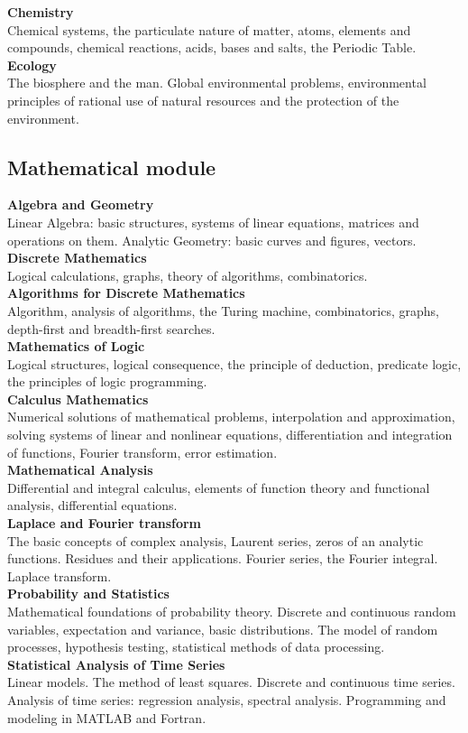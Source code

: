 \documentclass[a4paper, 12pt]{article}
\newcommand{\group}[1] {\subsection{#1}}
\newcommand{\discipline}[1] {\textbf{#1} \\ }
\newcommand{\desc}[1] { #1 \\ }
\begin{document}
\discipline{Chemistry}
\desc{Chemical systems, the particulate nature of matter, atoms, elements and compounds, chemical reactions, acids, bases and salts, the Periodic Table.}

\discipline{Ecology}
\desc{The biosphere and the man. Global environmental problems, environmental principles of rational use of natural resources and the protection of the environment.}


\group{Mathematical module}

\discipline{Algebra and Geometry}
\desc{Linear Algebra: basic structures, systems of linear equations, matrices and operations on them. Analytic Geometry: basic curves and figures, vectors.}

\discipline{Discrete Mathematics}
\desc{Logical calculations, graphs, theory of algorithms, combinatorics.}

\discipline{Algorithms for Discrete Mathematics}
\desc{Algorithm, analysis of algorithms, the Turing machine, combinatorics, graphs, depth-first and breadth-first searches.}

\discipline{Mathematics of Logic}
\desc{Logical structures, logical consequence, the principle of deduction, predicate logic, the principles of logic programming.}

\discipline{Calculus Mathematics}
\desc{Numerical solutions of mathematical problems, interpolation and approximation, solving systems of linear and nonlinear equations, differentiation and integration of functions, Fourier transform, error estimation.}

\discipline{Mathematical Analysis}
\desc{Differential and integral calculus, elements of function theory and functional analysis, differential equations.}

\discipline{Laplace and Fourier transform}
\desc{The basic concepts of complex analysis, Laurent series, zeros of an analytic functions. Residues and their applications. Fourier series, the Fourier integral. Laplace transform.}

\discipline{Probability and Statistics}
\desc{Mathematical foundations of probability theory. Discrete and continuous random variables, expectation and variance, basic distributions. The model of random processes, hypothesis testing, statistical methods of data processing.}

\discipline{Statistical Analysis of Time Series}
\desc{Linear models. The method of least squares. Discrete and continuous time series. Analysis of time series: regression analysis, spectral analysis. Programming and modeling in MATLAB and Fortran.}
\end{document}
